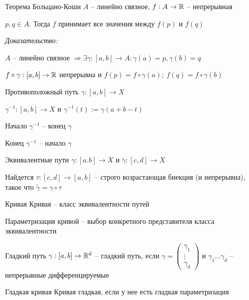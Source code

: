 \documentclass[12pt]{article}
\begin{document}
\begin{theo}{Теорема Больцано-Коши}
    $A$ -- линейно связное, $f : A \to \mathbb R$ -- непрерывная

    $p, q \in A$. Тогда $f$ принимает все значения между $f(p)$ и $f(q)$
\end{theo}

\textit{Доказательство:}

$A$ -- линейно связное $\Rightarrow \exists \gamma : [a, b] \to A : \gamma(a) = p, \gamma(b) = q$

$f \circ \gamma : [a, b] \to \mathbb R$ непрерывна и $f(p) = f \circ \gamma(a);\ f(q) = f \circ \gamma(b)$

\begin{defin}{Противоположный путь}
    $\gamma : [a, b] \to X$

    $\gamma^{-1}: [a, b] \to X$ и $\gamma^{-1}(t) := \gamma(a + b - t)$

    Начало $\gamma^{-1}$ -- конец $\gamma$

    Конец $\gamma^{-1}$ -- начало $\gamma$
\end{defin}

\begin{defin}{Эквивалентные пути}
    $\gamma : [a. b] \to X$ и $\tilde{\gamma} : [c, d] \to X$

    Найдется $\tau : [c, d] \to [a, b]$ -- строго возрастающая биекция (и непрерывна), такое что $\tilde{\gamma} = \gamma \circ \tau$ 
\end{defin}

\begin{defin}{Кривая}
    Кривая -- класс эквивалентности путей

    Параметризация кривой -- выбор конкретного представителя класса эквивалентности
\end{defin}

\begin{defin}{Гладкий путь}
    $\gamma : [a, b] \to \mathbb R^d$ -- гладкий путь, если $\gamma = \begin{pmatrix}
        \gamma_1 \\
        \vdots \\
        \gamma_d 
    \end{pmatrix}$ и $\gamma_1 \ldots \gamma_d$ -- непрерывные дифференцируемые 
\end{defin}

\begin{defin}{Гладкая кривая}
    Кривая гладкая, если у нее есть гладкая параметризация
\end{defin}
\end{document}
